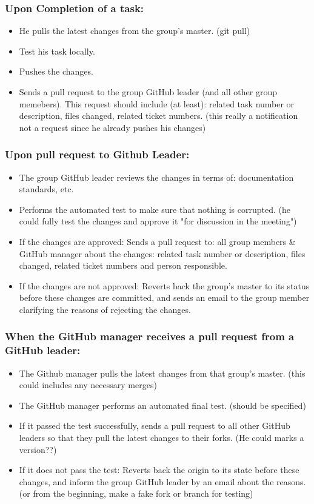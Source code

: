 \documentclass{article}
\begin{document}
\subsubsection{Upon Completion of a task:}
\begin{itemize}	
\item He pulls the latest changes from the group's master. (git pull)
\item Test his task locally.
\item Pushes the changes.
\item Sends a pull request to the group GitHub leader (and all other group memebers). This request should include (at least): related task number or description, files changed, related ticket numbers. (this really a notification not a request since he already pushes his changes)
\end{itemize}

\subsubsection{Upon pull request to Github Leader:}
\begin{itemize}	
\item The group GitHub leader reviews the changes in terms of: documentation standards, etc.
\item Performs the automated test to make sure that nothing is corrupted. (he could fully test the changes and approve it "for discussion in the meeting")
\item If the changes are approved: Sends a pull request to: all group members & GitHub manager about the changes:  related task number or description, files changed, related ticket numbers and person responsible.
\item If the changes are not approved: Reverts back the group's master  to its status before these changes are committed, and sends an email to the group member clarifying the reasons of rejecting the changes.
\end{itemize}

\subsubsection{When the GitHub manager receives a pull request from a GitHub leader:}
\begin{itemize}	
\item The Github manager pulls the latest changes from that group's master. (this could includes any necessary merges)
\item The GitHub manager performs an automated final test. (should be specified) 
\item If it passed the test successfully, sends a pull request to all other GitHub leaders so that they pull the latest changes to their forks.
(He could marks a version??)
\item If it does not pass the test: Reverts back the origin to its state before these changes, and inform the group GitHub leader by an email about the reasons. (or from the beginning, make a fake fork or branch for testing)
\end{itemize}
\end{document}
